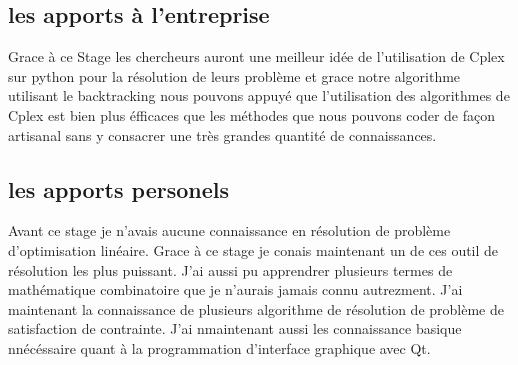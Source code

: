 \subsection{les apports à l'entreprise}
Grace à ce Stage les chercheurs auront une meilleur idée de l'utilisation de Cplex sur python pour la résolution de leurs problème et grace notre algorithme utilisant le backtracking nous pouvons appuyé que l'utilisation des algorithmes de Cplex est bien plus éfficaces que les méthodes que nous pouvons coder de façon artisanal sans y consacrer une très grandes quantité de connaissances.

\subsection{les apports personels}

Avant ce stage je n'avais aucune connaissance en résolution de problème d'optimisation linéaire. Grace à ce stage je conais maintenant un de ces outil de résolution les plus puissant. J'ai aussi pu apprendrer plusieurs termes de mathématique combinatoire que je n'aurais jamais connu autrezment. J'ai maintenant la connaissance de plusieurs algorithme de résolution de problème de satisfaction de contrainte. J'ai nmaintenant aussi les connaissance basique nnécéssaire quant à la programmation d'interface graphique avec Qt.
